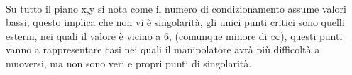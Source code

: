 \\Su tutto il piano x,y si nota come il numero di condizionamento assume valori bassi, questo implica che non vi è singolarità, gli unici punti critici sono quelli esterni, nei quali il valore è vicino a 6, (comunque minore di $\infty$), questi punti vanno a rappresentare casi nei quali il manipolatore avrà più difficoltà a muoversi, ma non sono veri e propri punti di singolarità.